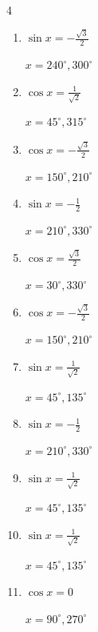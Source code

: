 \begin{multicols}{4}
\begin{enumerate}
        $\displaystyle x = 60^{\circ} , 120^{\circ}$

  \item $\displaystyle \sin{x}  = -\frac{\sqrt{3}}{2}$

        $\displaystyle x = 240^{\circ} , 300^{\circ}$

  \item $\displaystyle \cos{x}  = \frac{1}{\sqrt{2}}$

        $\displaystyle x = 45^{\circ} , 315^{\circ}$

\columnbreak %

  \item $\displaystyle \cos{x}  = -\frac{\sqrt{3}}{2}$

        $\displaystyle x = 150^{\circ} , 210^{\circ}$

  \item $\displaystyle \sin{x}  = -\frac{1}{2}$

        $\displaystyle x = 210^{\circ} , 330^{\circ}$

  \item $\displaystyle \cos{x}  = \frac{\sqrt{3}}{2}$

        $\displaystyle x = 30^{\circ} , 330^{\circ}$

  \item $\displaystyle \cos{x}  = -\frac{\sqrt{3}}{2}$

        $\displaystyle x = 150^{\circ} , 210^{\circ}$

  \item $\displaystyle \sin{x}  = \frac{1}{\sqrt{2}}$

        $\displaystyle x = 45^{\circ} , 135^{\circ}$

  \item $\displaystyle \sin{x}  = -\frac{1}{2}$

        $\displaystyle x = 210^{\circ} , 330^{\circ}$

  \item $\displaystyle \sin{x}  = \frac{1}{\sqrt{2}}$

        $\displaystyle x = 45^{\circ} , 135^{\circ}$

  \item $\displaystyle \sin{x}  = \frac{1}{\sqrt{2}}$

        $\displaystyle x = 45^{\circ} , 135^{\circ}$

  \item $\displaystyle \cos{x}  = 0$

        $\displaystyle x = 90^{\circ} , 270^{\circ}$


\end{enumerate}
\end{multicols}
